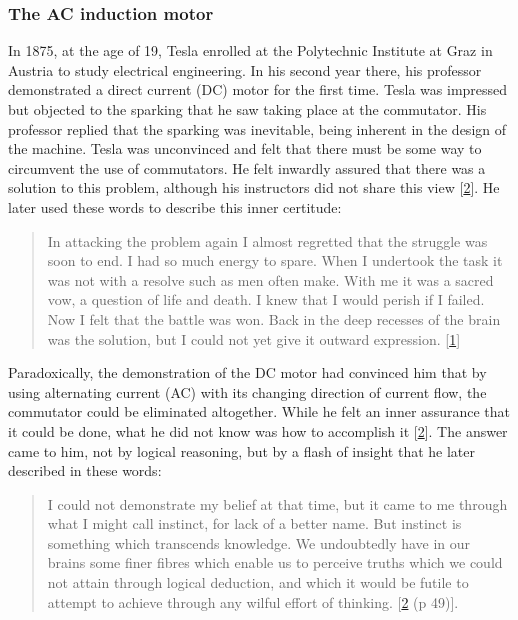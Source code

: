 \documentclass[
  a4paper,
]{article}
\begin{document}
\hypertarget{the-ac-induction-motor}{%
\subsubsection{The AC induction motor}\label{the-ac-induction-motor}}

In 1875, at the age of 19, Tesla enrolled at the Polytechnic Institute
at Graz in Austria to study electrical engineering. In his second year
there, his professor demonstrated a direct current (DC) motor for the
first time. Tesla was impressed but objected to the sparking that he saw
taking place at the commutator. His professor replied that the sparking
was inevitable, being inherent in the design of the machine. Tesla was
unconvinced and felt that there must be some way to circumvent the use
of commutators. He felt inwardly assured that there was a solution to
this problem, although his instructors did not share this view
{[}\protect\hyperlink{ref-oneill80}{2}{]}. He later used these words to
describe this inner certitude:

\begin{quote}
In attacking the problem again I almost regretted that the struggle was
soon to end. I had so much energy to spare. When I undertook the task it
was not with a resolve such as men often make. With me it was a sacred
vow, a question of life and death. I knew that I would perish if I
failed. Now I felt that the battle was won. Back in the deep recesses of
the brain was the solution, but I could not yet give it outward
expression. {[}\protect\hyperlink{ref-john83}{1}{]}
\end{quote}

Paradoxically, the demonstration of the DC motor had convinced him that
by using alternating current (AC) with its changing direction of current
flow, the commutator could be eliminated altogether. While he felt an
inner assurance that it could be done, what he did not know was how to
accomplish it {[}\protect\hyperlink{ref-oneill80}{2}{]}. The answer came
to him, not by logical reasoning, but by a flash of insight that he
later described in these words:

\begin{quote}
I could not demonstrate my belief at that time, but it came to me
through what I might call instinct, for lack of a better name. But
instinct is something which transcends knowledge. We undoubtedly have in
our brains some finer fibres which enable us to perceive truths which we
could not attain through logical deduction, and which it would be futile
to attempt to achieve through any wilful effort of thinking.
{[}\protect\hyperlink{ref-oneill80}{2} (p 49){]}.
\end{quote}
\end{document}

